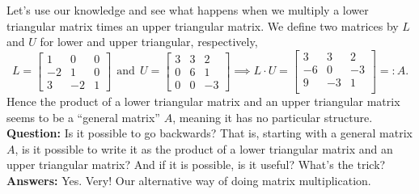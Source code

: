 Let's use our knowledge and see what happens when we multiply a lower triangular matrix times an upper triangular matrix. We define two matrices by $L$ and $U$ for lower and upper triangular, respectively, 
$$L=\left[\begin{array}{rrr} 1 & 0 & 0\\
-2 & 1 & 0 \\ 3 & -2 & 1  \end{array}\right]~~\text{and}~~U=\left[\begin{array}{rrr} 
    3 & 3 & 2\\
0 & 6 & 1 \\ 
0 & 0 & -3  \end{array}\right] \implies L\cdot U = \left[ \begin{array}{rrr}
     3   &  3  &   2 \\
    -6   &  0  &  -3 \\
     9  &  -3    &  1 \\
\end{array} \right] =:A. $$
Hence the product of a lower triangular matrix and an upper triangular matrix seems to be a ``general matrix'' $A$, meaning it has no particular structure. \\

\textbf{Question:} Is it possible to go backwards? That is, starting with a general matrix $A$, is it possible to write it as the product of a lower triangular matrix and an upper triangular matrix? And if it is possible, is it useful? What's the trick?\\

\textbf{Answers:} Yes. Very! Our alternative way of doing matrix multiplication.\\
